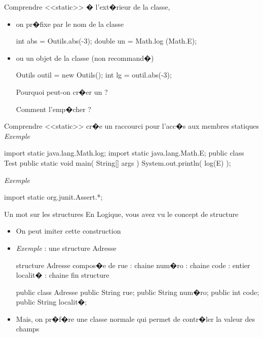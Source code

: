 \begin{frame}[fragile]{Comprendre <<static>>}
  � l'ext�rieur de la classe, 
  \begin{itemize}
  \item on pr�fixe par le nom de la classe
  \begin{Java}
  int abs = Outils.abs(-3);
  double un = Math.log (Math.E);
  \end{Java}
  \item ou un objet de la classe (non recommand�)
  \begin{Java}
  Outils outil = new Outils();
  int lg = outil.abs(-3);
  \end{Java}
  Pourquoi peut-on cr�er un  ?
 
  Comment l'emp�cher ?
  \end{itemize}
\end{frame}

\begin{frame}[fragile]{Comprendre <<static>>}
   cr�e un raccourci pour l'acc�s aux membres statiques 
  \\\medskip\emph{Exemple}
  \begin{Java}
  import static java.lang.Math.log;
  import static java.lang.Math.E;
  public class Test {
    public static void main( String[] args ) {
      System.out.println( log(E) );
    }
  }
  \end{Java}
  \medskip\emph{Exemple}
  \begin{Java}
  import static org.junit.Assert.*;
  \end{Java}
\end{frame}

\begin{frame}[fragile]{Un mot sur les structures}
En Logique, vous avez vu le concept de structure
\begin{itemize}
\item On peut imiter cette construction
\item \emph{Exemple} : une structure Adresse
\vspace{-0.5cm}
\begin{multicols}{2}
\begin{Code}
structure Adresse compos�e de
    rue : chaine
    num�ro : chaine
    code : entier
   localit� : chaine
fin structure
\end{Code}
\begin{Java}
public class Adresse {
    public String rue;
    public String num�ro;
    public int    code;
    public String localit�;
}
\end{Java}
\end{multicols}
\vspace{-0.5cm}
\item Mais, on pr�f�re une classe normale qui permet de contr�ler la valeur des champs
\end{itemize}
\end{frame}

